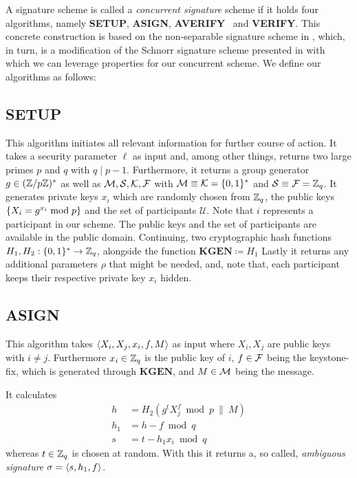 A signature scheme is called a \textit{concurrent signature} scheme if it holds four algorithms, namely \textbf{SETUP}, \textbf{ASIGN}, \textbf{AVERIFY}~ and \textbf{VERIFY}.
This concrete construction is based on the non-separable signature scheme in \cite{abe20021}, which, in turn, is a modification of the Schnorr signature scheme presented in \cite{schnorr1991efficient} with which we can leverage properties for our concurrent scheme.
We define our algorithms as follows:
   
\subsection{\textbf{SETUP}}
  This algorithm initiates all relevant information for further course of action.
  It takes a security parameter \(\ell\) as input and, among other things, returns two large primes \(p\) and \(q\) with \(q \mid p-1\).
  Furthermore, it returns a group generator \(g\in(\mathbb{Z}/p\mathbb{Z})^\ast\) as well as \(\mathcal{M}, \mathcal{S}, \mathcal{K}, \mathcal{F}\) with \(\mathcal{M} \equiv \mathcal{K} =  \{ 0,1 \}^\ast\) and \(\mathcal{S} \equiv \mathcal{F} = \mathbb{Z}_q\).
  It generates private keys \(x_i\) which are randomly chosen from \(\mathbb{Z}_q\), the public keys \( \{ X_i = g^{x_i} \bmod p \}\) and the set of participants \(\mathcal{U}\).
  Note that \(i\) represents a participant in our scheme.
  The public keys and the set of participants are available in the public domain.
  Continuing, two cryptographic hash functions \(H_1, H_2:  \{ 0,1 \}^\ast \to \mathbb{Z}_q\), alongside the function \(\textbf{KGEN} \coloneqq H_1\)
  Lastly it returns any additional parameters \(\rho\) that might be needed, and, note that, each participant keeps their respective private key \(x_i\) hidden. 

\subsection{\textbf{ASIGN}}
  This algorithm takes \(\langle X_i, X_j, x_i, f, M \rangle\) as input where \(X_i, X_j\) are public keys with \(i\neq j\).
  Furthermore \(x_i\in\mathbb{Z}_q\) is the public key of \(i\), \(f\in\mathcal{F}\) being the keystone-fix, which is generated through \(\textbf{KGEN}\), and \(M\in\mathcal{M}\) being the message.
  
  It calculates
    \begin{align*}
      h &= H_2(g^t X_j^f \bmod p ~\|~ M)\\
      h_1 &= h - f \bmod q\\
      s &= t - h_1 x_i \bmod q
    \end{align*}
  whereas \(t\in \mathbb{Z}_q\) is chosen at random.
  With this it returns a, so called, \textit{ambiguous signature} \(\sigma=\langle s, h_1, f \rangle\).


